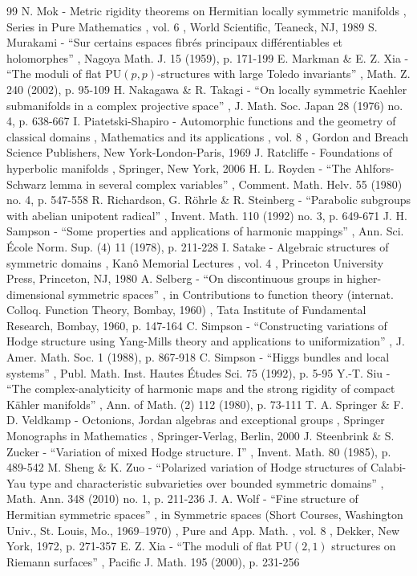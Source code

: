\begin{thebibliography}{99}
 N. Mok - Metric rigidity theorems on Hermitian locally symmetric manifolds , Series in Pure Mathematics , vol. 6 , World Scientific, Teaneck, NJ, 1989
 S. Murakami - “Sur certains espaces fibrés principaux différentiables et holomorphes” , Nagoya Math. J. 15 (1959), p. 171-199
 E. Markman \& E. Z. Xia - “The moduli of flat $\mathrm{PU}(p,p)$-structures with large Toledo invariants” , Math. Z. 240 (2002), p. 95-109
 H. Nakagawa \& R. Takagi - “On locally symmetric Kaehler submanifolds in a complex projective space” , J. Math. Soc. Japan 28 (1976) no. 4, p. 638-667
 I. Piatetski-Shapiro - Automorphic functions and the geometry of classical domains , Mathematics and its applications , vol. 8 , Gordon and Breach Science Publishers, New York-London-Paris, 1969
 J. Ratcliffe - Foundations of hyperbolic manifolds , Springer, New York, 2006
 H. L. Royden - “The Ahlfors-Schwarz lemma in several complex variables” , Comment. Math. Helv. 55 (1980) no. 4, p. 547-558
 R. Richardson, G. Röhrle \& R. Steinberg - “Parabolic subgroups with abelian unipotent radical” , Invent. Math. 110 (1992) no. 3, p. 649-671
 J. H. Sampson - “Some properties and applications of harmonic mappings” , Ann. Sci. École Norm. Sup. (4) 11 (1978), p. 211-228
 I. Satake - Algebraic structures of symmetric domains , Kanô Memorial Lectures , vol. 4 , Princeton University Press, Princeton, NJ, 1980
 A. Selberg - “On discontinuous groups in higher-dimensional symmetric spaces” , in Contributions to function theory (internat. Colloq. Function Theory, Bombay, 1960) , Tata Institute of Fundamental Research, Bombay, 1960, p. 147-164
 C. Simpson - “Constructing variations of Hodge structure using Yang-Mills theory and applications to uniformization” , J. Amer. Math. Soc. 1 (1988), p. 867-918
 C. Simpson - “Higgs bundles and local systems” , Publ. Math. Inst. Hautes Études Sci. 75 (1992), p. 5-95
 Y.-T. Siu - “The complex-analyticity of harmonic maps and the strong rigidity of compact Kähler manifolds” , Ann. of Math. (2) 112 (1980), p. 73-111
 T. A. Springer \& F. D. Veldkamp - Octonions, Jordan algebras and exceptional groups , Springer Monographs in Mathematics , Springer-Verlag, Berlin, 2000
 J. Steenbrink \& S. Zucker - “Variation of mixed Hodge structure. I” , Invent. Math. 80 (1985), p. 489-542
 M. Sheng \& K. Zuo - “Polarized variation of Hodge structures of Calabi-Yau type and characteristic subvarieties over bounded symmetric domains” , Math. Ann. 348 (2010) no. 1, p. 211-236
 J. A. Wolf - “Fine structure of Hermitian symmetric spaces” , in Symmetric spaces (Short Courses, Washington Univ., St. Louis, Mo., 1969–1970) , Pure and App. Math. , vol. 8 , Dekker, New York, 1972, p. 271-357
 E. Z. Xia - “The moduli of flat $\mathrm{PU}(2,1)$ structures on Riemann surfaces” , Pacific J. Math. 195 (2000), p. 231-256
\end{thebibliography}
